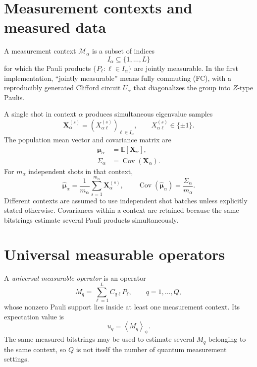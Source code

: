 \documentclass[11pt]{article}
\newcommand{\expect}[1]{\left\langle#1\right\rangle}
\newcommand{\Cov}{\operatorname{Cov}}
\newcommand{\Mset}{\mathcal M}
\begin{document}
\section{Measurement contexts and measured data}

A measurement context $\Mset_\alpha$ is a subset of indices
\begin{equation}
  I_\alpha\subseteq\{1,\ldots,L\}
\end{equation}
for which the Pauli products $\{P_\ell:\ell\in I_\alpha\}$ are jointly measurable.  In the first implementation, ``jointly measurable'' means fully commuting (FC), with a reproducibly generated Clifford circuit $U_\alpha$ that diagonalizes the group into $Z$-type Paulis.

A single shot in context $\alpha$ produces simultaneous eigenvalue samples
\begin{equation}
  \bm X_\alpha^{(s)}
  =\left(X_{\alpha\ell}^{(s)}\right)_{\ell\in I_\alpha},
  \qquad X_{\alpha\ell}^{(s)}\in\{\pm1\}.
\end{equation}
The population mean vector and covariance matrix are
\begin{align}
  \bm\mu_\alpha &= \mathbb E[\bm X_\alpha],\\
  \Sigma_\alpha &= \Cov(\bm X_\alpha).
  \label{eq:context-cov}
\end{align}
For $m_\alpha$ independent shots in that context,
\begin{equation}
  \widehat{\bm\mu}_\alpha
  =\frac{1}{m_\alpha}\sum_{s=1}^{m_\alpha}\bm X_\alpha^{(s)},
  \qquad
  \Cov(\widehat{\bm\mu}_\alpha)=\frac{\Sigma_\alpha}{m_\alpha}.
\end{equation}
Different contexts are assumed to use independent shot batches unless explicitly stated otherwise.  Covariances within a context are retained because the same bitstrings estimate several Pauli products simultaneously.

\section{Universal measurable operators}

A \emph{universal measurable operator} is an operator
\begin{equation}
  M_q=\sum_{\ell=1}^{L}C_{q\ell}P_\ell,
  \qquad q=1,\ldots,Q,
  \label{eq:universal-vector}
\end{equation}
whose nonzero Pauli support lies inside at least one measurement context.  Its expectation value is
\begin{equation}
  u_q=\expect{M_q}_\psi.
\end{equation}
The same measured bitstrings may be used to estimate several $M_q$ belonging to the same context, so $Q$ is not itself the number of quantum measurement settings.
\end{document}
